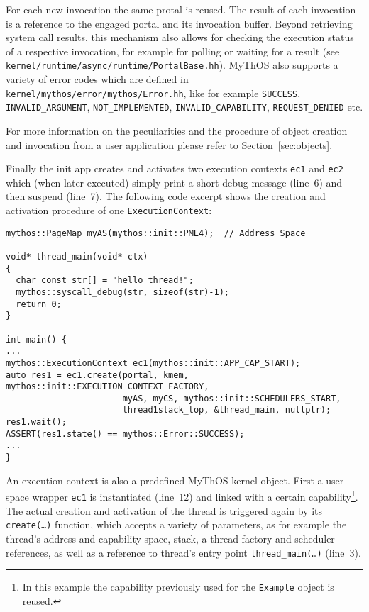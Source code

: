 \noindent For each new invocation the same protal is reused. The result of each
invocation is a reference to the engaged portal and its invocation buffer.
Beyond retrieving system call results, this mechanism also allows for checking
the execution status of a respective invocation, for example for polling or
waiting for a result (see \texttt{kernel/runtime/async/runtime/PortalBase.hh}).
MyThOS also supports a variety of error codes which are defined in
\texttt{kernel/mythos/error/mythos/Error.hh}, like for example \texttt{SUCCESS},
\texttt{INVALID\_ARGUMENT}, \texttt{NOT\_IMPLEMENTED},
\texttt{INVALID\_CAPABILITY}, \texttt{REQUEST\_DENIED} etc.

For more information on the peculiarities
and the procedure of object creation and invocation from a user application
please refer to Section~\ref{sec:objects}.

Finally the init app creates and activates two execution contexts \texttt{ec1}
and \texttt{ec2} which (when later executed) simply print a short debug message
(line~6) and then suspend (line~7). The following code excerpt shows the
creation and activation procedure of one \texttt{ExecutionContext}:

\lstset{language=c++}
\begin{lstlisting}
mythos::PageMap myAS(mythos::init::PML4);  // Address Space

void* thread_main(void* ctx)
{
  char const str[] = "hello thread!";
  mythos::syscall_debug(str, sizeof(str)-1);
  return 0;
}

int main() {
...
mythos::ExecutionContext ec1(mythos::init::APP_CAP_START);
auto res1 = ec1.create(portal, kmem, mythos::init::EXECUTION_CONTEXT_FACTORY,
                       myAS, myCS, mythos::init::SCHEDULERS_START,
                       thread1stack_top, &thread_main, nullptr);
res1.wait();
ASSERT(res1.state() == mythos::Error::SUCCESS);
...
}
\end{lstlisting}

An execution context is also a predefined MyThOS kernel object.
First a user space wrapper \texttt{ec1} is instantiated (line~12) and linked
with a certain capability\footnote{In this example the capability previously
used for the \texttt{Example} object is reused.}.
The actual creation and activation of the thread is triggered again by its
\texttt{create(\ldots)} function, which accepts a variety of parameters, as for
example the thread's address and capability space, stack, a thread factory and
scheduler references, as well as a reference to thread's entry point
\texttt{thread\_main(\ldots)} (line~3).

